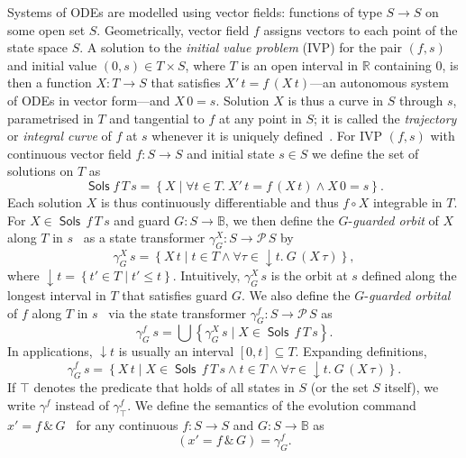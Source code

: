 \documentclass[envcountsame,envcountsect]{llncs}
\newcommand{\Pow}{\mathcal{P}}
\newcommand{\reals}{\mathbb{R}}
\newcommand{\bools}{\mathbb{B}}
\newcommand{\Sols}{\mathop{\mathsf{Sols}}}
\begin{document}
Systems of ODEs are modelled using vector fields: functions of type
$S\to S$ on some open set $S$. Geometrically, vector field $f$ assigns
vectors to each point of the state space $S$. A solution to the
\emph{initial value problem} (IVP) for the pair $(f,s)$ and initial
value $(0,s)\in T\times S$, where $T$ is an open interval in $\reals$
containing $0$, is then a function $X:T\to S$ that satisfies
$X'\, t = f\, (X\, t)$---an autonomous system of ODEs in vector
form---and $X\, 0 = s$. Solution $X$ is thus a curve in $S$ through
$s$, parametrised in $T$ and tangential to $f$ at any point in $S$; it
is called the \emph{trajectory} or \emph{integral curve} of $f$ at $s$
whenever it is uniquely defined~\cite{Teschl12}.  For IVP $(f,s)$ with
continuous vector field $f:S\to S$ and initial state $s\in S$ we
define the set of solutions on $T$ as
\begin{equation*}
\Sols f\, T\, s = \left\{X \mid \forall t\in T.\  X'\, t = f\, (X\, t)\land X\, 0 = s\right\}.
\end{equation*}
Each solution $X$ is thus continuously differentiable and thus
$f\circ X$ integrable in $T$.  For $X\in \Sols\, f\, T\, s$ and guard
$G:S\to\bools$, we then define the $G$-\emph{guarded orbit} of $X$
along $T$ in $s$~\cite{MuniveS19} as a state transformer
$\gamma^X_G:S\to \Pow\, S$ by
\begin{equation*}
\gamma^X_{G}\, s= \left\{X\, t\mid t\in T\land \forall \tau\in
{\downarrow}t.\ G\, (X\, \tau)\right\},
\end{equation*}
where ${\downarrow}t = \left\{t'\in T\mid t'\le t\right\}$.
Intuitively, $\gamma_G^X\, s$ is the orbit at $s$ defined along the
longest interval in $T$ that satisfies guard $G$. We also define the
$G$-\emph{guarded orbital} of $f$ along $T$ in $s$~\cite{MuniveS19}
via the state transformer $\gamma^f_G:S\to \Pow\, S$ as
\begin{equation*}
  \gamma^f_G\ s = \bigcup\left\{\gamma^X_G\, s\mid X\in \Sols\, f\, T\, s\right\}.
\end{equation*}
In applications, ${\downarrow}t$ is usually an interval
$[0,t]\subseteq T$. Expanding definitions,
\begin{equation*}
\gamma^f_G\, s = \left\{X\, t \mid X\in \Sols\, f\, T\, s \land t\in T
\land \forall \tau\in{\downarrow}t.\ G\, (X\, \tau)\right\}.
\end{equation*}
If $\top$ denotes the predicate that holds of all states in $S$ (or
the set $S$ itself), we write $\gamma^f$ instead of
$\gamma^f_\top$. We define the semantics of the evolution command
$x'= f\, \&\, G$~\cite{MuniveS19} for any continuous $f:S\to S$ and
$G:S\to \bools$ as
\begin{equation}
{\left(x'= f\, \&\, G\right)} = \gamma^f_G.\label{eq:st-evl}\tag{st-evl}
\end{equation}
\end{document}

